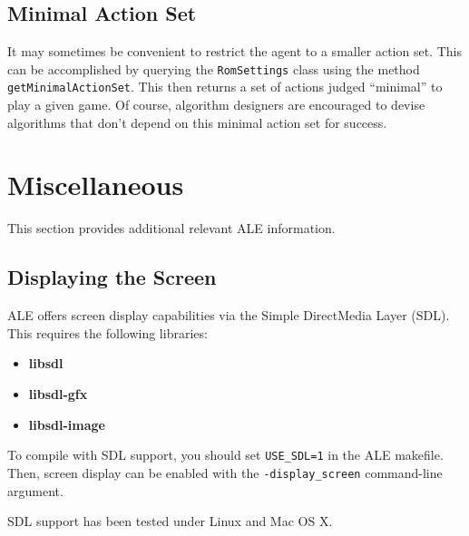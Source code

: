 \documentclass[12pt]{article}
\begin{document}
\subsection{Minimal Action Set}

It may sometimes be convenient to restrict the agent to a smaller action set. This can be
accomplished by querying the \verb+RomSettings+ class using the method 
\verb+getMinimalActionSet+. This then returns a set of actions judged ``minimal'' to play a given
game. Of course, algorithm designers are encouraged to devise algorithms that don't depend 
on this minimal action set for success.

\section{Miscellaneous}

This section provides additional relevant ALE information.

\subsection{Displaying the Screen}

ALE offers screen display capabilities via the Simple DirectMedia Layer (SDL). This requires
the following libraries:

\begin{itemize}
  \item{\textbf{libsdl}}
  \item{\textbf{libsdl-gfx}}
  \item{\textbf{libsdl-image}}
\end{itemize}

To compile with SDL support, you should set \verb+USE_SDL=1+ in the ALE makefile. Then, screen
display can be enabled with the \verb+-display_screen+ command-line argument. 

SDL support has been tested under Linux and Mac OS X. 
\end{document}
